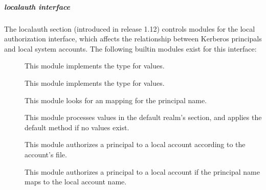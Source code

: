\documentclass[letterpaper,10pt,english]{sphinxmanual}
\begin{document}
\subparagraph{localauth interface}
\label{\detokenize{admin/conf_files/krb5_conf:localauth-interface}}\label{\detokenize{admin/conf_files/krb5_conf:localauth}}
\sphinxAtStartPar
The localauth section (introduced in release 1.12) controls modules
for the local authorization interface, which affects the relationship
between Kerberos principals and local system accounts.  The following
built\sphinxhyphen{}in modules exist for this interface:
\begin{description}
\item[{}] \leavevmode
\sphinxAtStartPar
This module implements the  type for 
values.

\item[{}] \leavevmode
\sphinxAtStartPar
This module implements the  type for 
values.

\item[{}] \leavevmode
\sphinxAtStartPar
This module looks for an  mapping for the
principal name.

\item[{}] \leavevmode
\sphinxAtStartPar
This module processes  values in the default
realm’s section, and applies the default method if no
 values exist.

\item[{}] \leavevmode
\sphinxAtStartPar
This module authorizes a principal to a local account according to
the account’s  file.

\item[{}] \leavevmode
\sphinxAtStartPar
This module authorizes a principal to a local account if the
principal name maps to the local account name.

\end{description}
\end{document}
